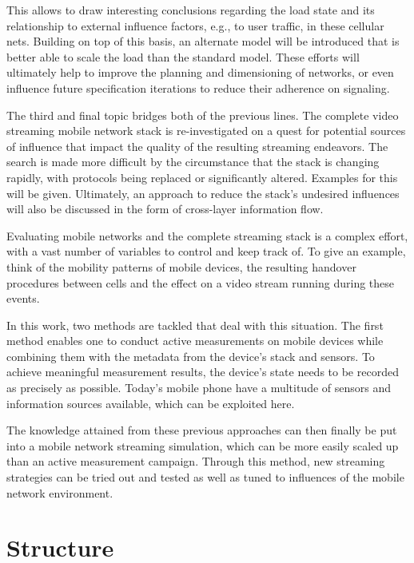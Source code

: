 This allows to draw interesting conclusions regarding the load state and its relationship to external influence factors, e.g., to user traffic, in these cellular nets. Building on top of this basis, an alternate model will be introduced that is better able to scale the load than the standard model. These efforts will ultimately help to improve the planning and dimensioning of networks, or even influence future specification iterations to reduce their adherence on signaling.


The third and final topic bridges both of the previous lines. The complete video streaming mobile network stack is re-investigated on a quest for potential sources of influence that impact the quality of the resulting streaming endeavors. The search is made more difficult by the circumstance that the stack is changing rapidly, with protocols being replaced or significantly altered. Examples for this will be given. Ultimately, an approach to reduce the stack's undesired influences will also be discussed in the form of cross-layer information flow.

Evaluating mobile networks and the complete streaming stack is a complex effort, with a vast number of variables to control and keep track of. To give an example, think of the mobility patterns of mobile devices, the resulting handover procedures between cells and the effect on a video stream running during these events. 

In this work, two methods are tackled that deal with this situation. The first method enables one to conduct active measurements on mobile devices while combining them with the metadata from the device's stack and sensors. To achieve meaningful measurement results, the device's state needs to be recorded as precisely as possible. Today's mobile phone have a multitude of sensors and information sources available, which can be exploited here.

The knowledge attained from these previous approaches can then finally be put into a mobile network streaming simulation, which can be more easily scaled up than an active measurement campaign. Through this method, new streaming strategies can be tried out and tested as well as tuned to influences of the mobile network environment.


\section{Structure}

